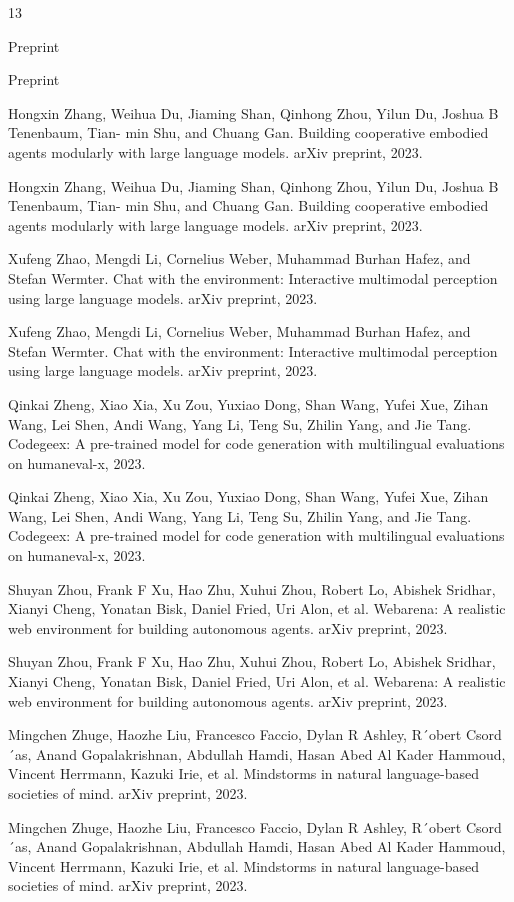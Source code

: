 \documentclass[12pt]{article}
\begin{document}
13


Preprint


Preprint


Hongxin Zhang, Weihua Du, Jiaming Shan, Qinhong Zhou, Yilun Du, Joshua B Tenenbaum, Tian-
min Shu, and Chuang Gan. Building cooperative embodied agents modularly with large language
models. arXiv preprint, 2023.


Hongxin Zhang, Weihua Du, Jiaming Shan, Qinhong Zhou, Yilun Du, Joshua B Tenenbaum, Tian-
min Shu, and Chuang Gan. Building cooperative embodied agents modularly with large language
models. arXiv preprint, 2023.


Xufeng Zhao, Mengdi Li, Cornelius Weber, Muhammad Burhan Hafez, and Stefan Wermter. Chat
with the environment: Interactive multimodal perception using large language models. arXiv
preprint, 2023.


Xufeng Zhao, Mengdi Li, Cornelius Weber, Muhammad Burhan Hafez, and Stefan Wermter. Chat
with the environment: Interactive multimodal perception using large language models. arXiv
preprint, 2023.


Qinkai Zheng, Xiao Xia, Xu Zou, Yuxiao Dong, Shan Wang, Yufei Xue, Zihan Wang, Lei Shen,
Andi Wang, Yang Li, Teng Su, Zhilin Yang, and Jie Tang. Codegeex: A pre-trained model for
code generation with multilingual evaluations on humaneval-x, 2023.


Qinkai Zheng, Xiao Xia, Xu Zou, Yuxiao Dong, Shan Wang, Yufei Xue, Zihan Wang, Lei Shen,
Andi Wang, Yang Li, Teng Su, Zhilin Yang, and Jie Tang. Codegeex: A pre-trained model for
code generation with multilingual evaluations on humaneval-x, 2023.


Shuyan Zhou, Frank F Xu, Hao Zhu, Xuhui Zhou, Robert Lo, Abishek Sridhar, Xianyi Cheng,
Yonatan Bisk, Daniel Fried, Uri Alon, et al. Webarena: A realistic web environment for building
autonomous agents. arXiv preprint, 2023.


Shuyan Zhou, Frank F Xu, Hao Zhu, Xuhui Zhou, Robert Lo, Abishek Sridhar, Xianyi Cheng,
Yonatan Bisk, Daniel Fried, Uri Alon, et al. Webarena: A realistic web environment for building
autonomous agents. arXiv preprint, 2023.


Mingchen Zhuge, Haozhe Liu, Francesco Faccio, Dylan R Ashley, R´obert Csord´as, Anand
Gopalakrishnan, Abdullah Hamdi, Hasan Abed Al Kader Hammoud, Vincent Herrmann, Kazuki
Irie, et al. Mindstorms in natural language-based societies of mind. arXiv preprint, 2023.


Mingchen Zhuge, Haozhe Liu, Francesco Faccio, Dylan R Ashley, R´obert Csord´as, Anand
Gopalakrishnan, Abdullah Hamdi, Hasan Abed Al Kader Hammoud, Vincent Herrmann, Kazuki
Irie, et al. Mindstorms in natural language-based societies of mind. arXiv preprint, 2023.
\end{document}
